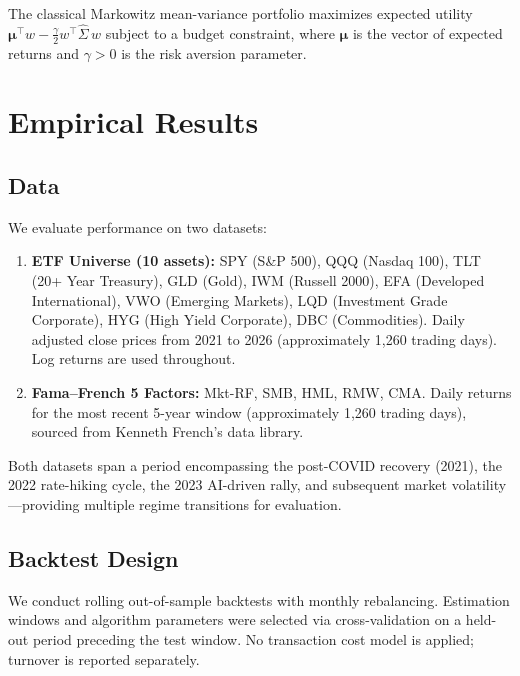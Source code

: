 \documentclass[12pt,a4paper]{article}
\begin{document}
The classical Markowitz mean-variance portfolio maximizes expected
utility $\bm{\mu}^\top w - \frac{\gamma}{2} w^\top \hat{\Sigma}\, w$
subject to a budget constraint, where $\bm{\mu}$ is the vector of expected
returns and $\gamma > 0$ is the risk aversion parameter.


\section{Empirical Results}\label{sec:results}

\subsection{Data}

We evaluate performance on two datasets:

\begin{enumerate}[label=(\roman*)]
    \item \textbf{ETF Universe (10 assets):} SPY (S\&P 500), QQQ (Nasdaq 100),
    TLT (20+ Year Treasury), GLD (Gold), IWM (Russell 2000), EFA (Developed
    International), VWO (Emerging Markets), LQD (Investment Grade Corporate),
    HYG (High Yield Corporate), DBC (Commodities). Daily adjusted close prices
    from 2021 to 2026 (approximately 1,260 trading days). Log returns are used
    throughout.

    \item \textbf{Fama--French 5 Factors:} Mkt-RF, SMB, HML, RMW, CMA. Daily
    returns for the most recent 5-year window (approximately 1,260 trading days),
    sourced from Kenneth French's data library.
\end{enumerate}

Both datasets span a period encompassing the post-COVID recovery (2021),
the 2022 rate-hiking cycle, the 2023 AI-driven rally, and subsequent
market volatility---providing multiple regime transitions for evaluation.

\subsection{Backtest Design}

We conduct rolling out-of-sample backtests with monthly rebalancing.
Estimation windows and algorithm parameters were selected via
cross-validation on a held-out period preceding the test window.
No transaction cost model is applied; turnover is reported separately.
\end{document}
